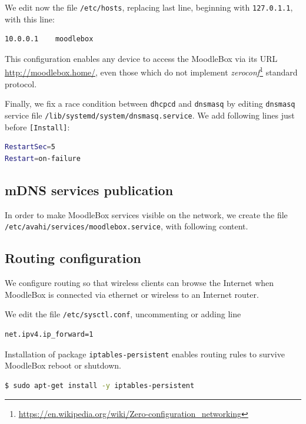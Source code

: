 \documentclass[12pt]{article}
\begin{document}


We edit now the file \lstinline{/etc/hosts}, replacing last line, beginning with \lstinline{127.0.1.1}, with this line:
\begin{lstlisting}[language=bash]
10.0.0.1	moodlebox
\end{lstlisting}
This configuration enables any device to access the MoodleBox via its URL \url{http://moodlebox.home/}, even those which do not implement \emph{zeroconf}\footnote{\url{https://en.wikipedia.org/wiki/Zero-configuration_networking}} standard protocol.

Finally, we fix a race condition between \lstinline{dhcpcd} and \lstinline{dnsmasq} by editing \lstinline{dnsmasq} service file \lstinline{/lib/systemd/system/dnsmasq.service}.
We add following lines just before \lstinline{[Install]}:
\begin{lstlisting}[language=bash]
RestartSec=5
Restart=on-failure
\end{lstlisting}

\subsection{mDNS services publication}

In order to make MoodleBox services visible on the network, we create the file \lstinline{/etc/avahi/services/moodlebox.service}, with following content.


\subsection{Routing configuration}

We configure routing so that wireless clients can browse the Internet when MoodleBox is connected via ethernet or wireless to an Internet router.

We edit the file \lstinline{/etc/sysctl.conf}, uncommenting or adding line
\begin{lstlisting}[language=bash]
net.ipv4.ip_forward=1
\end{lstlisting}

Installation of package \lstinline{iptables-persistent} enables routing rules to survive MoodleBox reboot or shutdown.
\begin{lstlisting}[language=bash]
$ sudo apt-get install -y iptables-persistent
\end{lstlisting}
\end{document}
